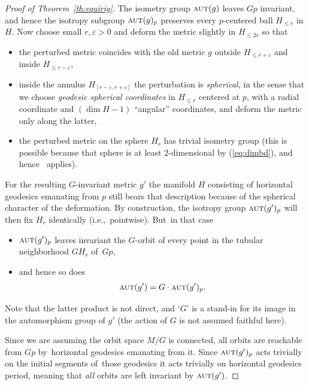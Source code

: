 \documentclass[10pt,a4paper]{amsart}
\numberwithin{equation}{section}
\newcommand{\cat}[1]{\textsc{#1}}
\begin{document}
\begin{proof}[Proof of Theorem~\ref{th:equirig}]
 The isometry group $\cat{aut}(g)$ leaves $Gp$ invariant, and hence the isotropy subgroup $\cat{aut}(g)_p$ preserves every $p$-centered ball $H_{\le r}$ in $H$. Now choose small $r,\varepsilon>0$ and deform the metric slightly in $H_{\le 2r}$ so that
 \begin{itemize}\itemsep=0pt
 \item the perturbed metric coincides with the old metric $g$ outside $H_{\le r+\varepsilon}$ and inside $H_{\le r-\varepsilon}$,
 \item inside the annulus $H_{[r-\varepsilon,r+\varepsilon]}$ the perturbation is {\it spherical}, in the sense that we choose {\it geodesic spherical coordinates} \cite[Section~III.1]{chav} in $H_{\le r}$ centered at $p$, with a radial coor\-dinate and $(\dim H-1)$ ``angular'' coordinates, and deform the metric only along the latter,
 \item the perturbed metric on the sphere $H_r$ has trivial isometry group (this is possible because that sphere is at least $2$-dimensional by (\ref{eq:dimbd}), and hence~\cite[Proposition~8.3]{eb} applies).
 \end{itemize}
 For the resulting $G$-invariant metric $g'$ the manifold $H$ consisting of horizontal geodesics emanating from $p$ still bears that description because of the spherical character of the deformation. By construction, the isotropy group $\cat{aut}(g')_p$ will then fix $H_{r}$ identically (i.e.,~pointwise). But~in that case
\begin{itemize}\itemsep=0pt
\item $\cat{aut}(g')_p$ leaves invariant the $G$-orbit of every point in the tubular neighborhood $GH_{r}$ of~$Gp$,
\item and hence so does
 \begin{gather*}
 \cat{aut}(g') = G \cdot \cat{aut}(g')_p.
 \end{gather*}
\end{itemize}
Note that the latter product is not direct, and `$G$' is a stand-in for its image in the automorphism group of $g'$ (the action of $G$ is not assumed faithful here).

Since we are assuming the orbit space $M/G$ is connected, all orbits are reachable from $Gp$ by~horizontal geodesics emanating from it. Since $\cat{aut}(g')_p$ acts trivially on the initial segments of~those geodesics it acts trivially on horizontal geodesics period, meaning that {\it all} orbits are left invariant by $\cat{aut}(g')$.
\end{proof}
\end{document}
